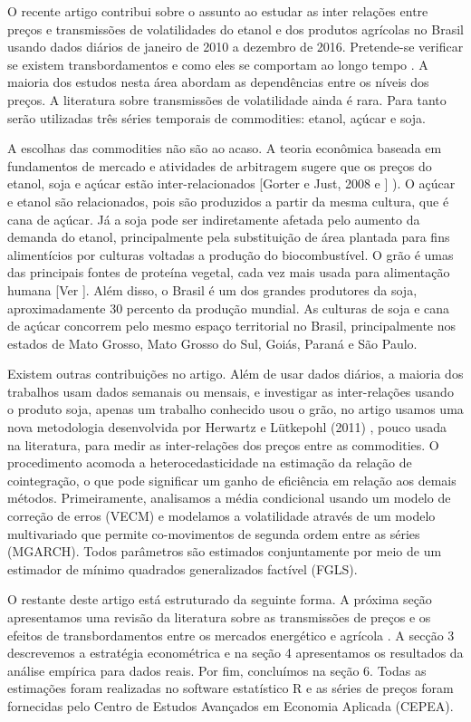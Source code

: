 \documentclass[a4paper,12pt] {article}
\begin{document}
O recente artigo contribui sobre o assunto ao estudar as inter relações  entre preços e transmissões de volatilidades do etanol e dos produtos agrícolas no Brasil usando dados diários de janeiro de 2010 a dezembro de 2016. Pretende-se verificar se existem transbordamentos e como eles se comportam ao longo tempo . A maioria dos estudos nesta área abordam as dependências entre os níveis dos preços. A literatura sobre transmissões de volatilidade ainda é rara. Para tanto serão utilizadas três séries temporais de commodities: etanol, açúcar e soja. 

A escolhas das commodities não são ao acaso. A teoria econômica baseada em fundamentos de mercado e atividades de arbitragem sugere que os preços do etanol, soja e açúcar estão inter-relacionados [Gorter e Just, 2008 e ] ). O açúcar e etanol são relacionados, pois são produzidos a partir da mesma cultura, que é cana de açúcar. Já a  soja pode ser indiretamente  afetada pelo aumento da demanda do etanol, principalmente pela substituição de área plantada para fins alimentícios por culturas voltadas a produção do biocombustível.  O grão é umas das principais fontes de proteína vegetal, cada vez mais usada para alimentação humana [Ver ].  Além disso, o Brasil é um dos grandes produtores da soja, aproximadamente 30  percento da produção mundial. As culturas de soja e cana de açúcar  concorrem pelo mesmo espaço territorial no Brasil, principalmente nos estados de Mato Grosso, Mato Grosso do Sul, Goiás, Paraná e São Paulo. 

Existem outras contribuições no artigo. Além de usar dados diários, a maioria dos trabalhos usam dados semanais ou mensais, e investigar as inter-relações usando o produto soja, apenas um trabalho conhecido usou o grão, no artigo usamos uma nova metodologia desenvolvida  por Herwartz e Lütkepohl (2011) , pouco usada na literatura, para medir as inter-relações dos preços entre as commodities. O procedimento  acomoda a heterocedasticidade na estimação da relação de cointegração, o que pode significar um ganho de eficiência em relação aos demais métodos. Primeiramente,  analisamos a média condicional usando um modelo de correção de erros (VECM) e modelamos a  volatilidade através de um modelo multivariado que permite co-movimentos de segunda ordem entre as séries (MGARCH).  Todos parâmetros  são estimados conjuntamente por meio de um estimador de mínimo quadrados generalizados factível (FGLS).

O restante deste artigo está estruturado da seguinte forma. A próxima seção apresentamos uma revisão da literatura sobre as transmissões de preços e os efeitos de transbordamentos entre os mercados energético e agrícola . A secção 3 descrevemos  a estratégia econométrica e na seção 4 apresentamos os resultados da análise empírica para dados reais. Por fim, concluímos na seção 6. Todas as estimações foram realizadas no software estatístico R e as séries de preços foram fornecidas pelo Centro de Estudos Avançados em Economia Aplicada (CEPEA).

 
\end{document}
